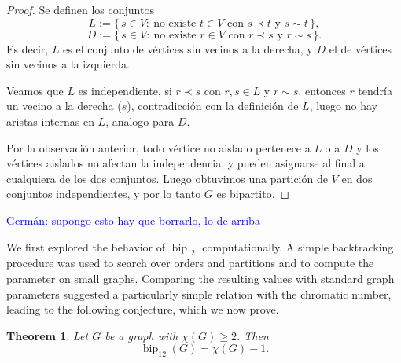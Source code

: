 \documentclass[12pt]{article}
\theoremstyle{plain}
\newtheorem{theorem}{Theorem}[section]
\theoremstyle{definition}
\theoremstyle{remark}
\theoremstyle{definition}
\newcommand{\biplabel}{\mathrm{bip}}
\DeclareRobustCommand{\bipparam}[1]{%
  \ensuremath{\mathop{\biplabel}\nolimits_{#1}}%
}
\newcommand{\german}[1]{%
  \textcolor{blue}{Germán: #1}%
}
\begin{document}
\begin{proof}
Se definen los conjuntos
\[
L:=\{\,s\in V:\ \text{no existe } t\in V \text{ con } s\prec t \text{ y } s\sim t\,\},
\]
\[
D:=\{\,s\in V:\ \text{no existe } r\in V \text{ con } r\prec s \text{ y } r\sim s\,\}.
\]
Es decir, \(L\) es el conjunto de vértices sin vecinos a la derecha, y \(D\) el de vértices sin vecinos a la izquierda.

Veamos que \(L\) es independiente, si \(r\prec s\) con \(r,s\in L\) y \(r\sim s\), entonces \(r\) tendría
un vecino a la derecha (\(s\)), contradicción con la definición de \(L\),
luego no hay aristas internas en \(L\), analogo para \(D\).



Por la observación anterior, todo vértice no aislado pertenece a \(L\) o a \(D\) y
los vértices aislados no afectan la independencia, y pueden asignarse al final a cualquiera de los dos conjuntos.
Luego obtuvimos una partición de \(V\) en dos conjuntos independientes, y por lo tanto \(G\) es bipartito.
\end{proof}

\german{supongo esto hay que borrarlo, lo de arriba}



We first explored the behavior of \(\bipparam{12}\) computationally.
A simple backtracking procedure was used to search over orders and
partitions and to compute the parameter on small graphs. Comparing the
resulting values with standard graph parameters suggested a particularly
simple relation with the chromatic number, leading to the following
conjecture, which we now prove.



\begin{theorem}\label{thm:bip12-chi}
Let \(G\) be a graph with \(\chi(G)\ge 2\). Then
\[
\bipparam{12}(G)=\chi(G)-1.
\]
\end{theorem}
\end{document}
